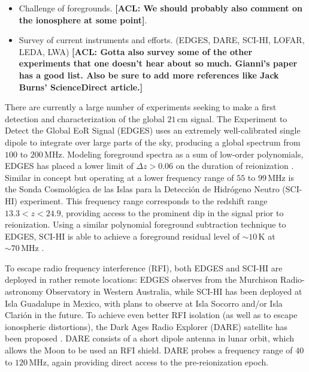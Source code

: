 \documentclass[twolcolumn,apj]{emulateapj}
\newcommand{\acl}[1]{{\color{red} \textbf{[ACL:  #1]}}}
\begin{document}
\begin{itemize}
\item Challenge of foregrounds.  \acl{We should probably also comment on the ionosphere at some point}.
\item Survey of current instruments and efforts. (EDGES, DARE, SCI-HI, LOFAR, LEDA, LWA) \acl{Gotta also survey some of the other experiments that one doesn't hear about so much.  Gianni's paper has a good list.  Also be sure to add more references like Jack Burns' ScienceDirect article.}
\end{itemize}
There are currently a large number of experiments seeking to make a first detection and characterization of the global $21\,\textrm{cm}$ signal.  The Experiment to Detect the Global EoR Signal (EDGES) uses an extremely well-calibrated single dipole \citep{rogersCalib} to integrate over large parts of the sky, producing a global spectrum from $100$ to $200\,\textrm{MHz}$.  Modeling foreground spectra as a sum of low-order polynomials, EDGES has placed a lower limit of $\Delta z > 0.06$ on the duration of reionization \citep{bowmanRogersMeasurement}.  Similar in concept but operating at a lower frequency range of $55$ to $99\,\textrm{MHz}$ is the Sonda Cosmol\'{o}gica de las Islas para la Detecci\'{o}n de Hidr\'{o}geno Neutro (SCI-HI) experiment.  This frequency range corresponds to the redshift range $13.3 < z < 24.9$, providing access to the prominent dip in the signal prior to reionization.  Using a similar polynomial foreground subtraction technique to EDGES, SCI-HI is able to achieve a foreground residual level of $\sim 10\,\textrm{K}$ at $\sim 70 \,\textrm{MHz}$ \citep{voytekSCIHI}.

To escape radio frequency interference (RFI), both EDGES and SCI-HI are deployed in rather remote locations: EDGES observes from the Murchison Radio-astronomy Observatory in Western Australia, while SCI-HI has been deployed at Isla Guadalupe in Mexico, with plans to observe at Isla Socorro and/or Isla Clari\'{o}n in the future.  To achieve even better RFI isolation (as well as to escape ionospheric distortions), the Dark Ages Radio Explorer (DARE) satellite has been proposed \citep{DAREMCMC}.  DARE consists of a short dipole antenna in lunar orbit, which allows the Moon to be used an RFI shield.  DARE probes a frequency range of $40$ to $120\,\textrm{MHz}$, again providing direct access to the pre-reionization epoch.
\end{document}
